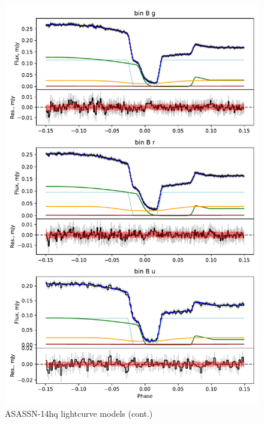 \begin{figure}
    \centering
    \includegraphics[width=\textwidth]{figures/results/ASASSN-14hq/ASASSN-14hq_2.pdf}
    \caption{ASASSN-14hq lightcurve models (cont.)}
    \label{fig:ASASSN-14hq all lightcurves cont}
\end{figure}



